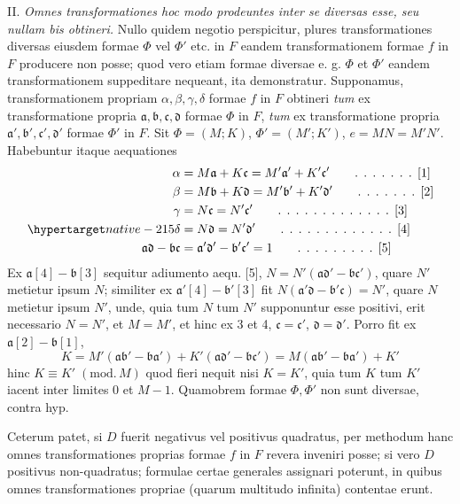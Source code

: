 II. \textit{Omnes transformationes hoc modo prodeuntes inter se diversas esse, seu nullam bis obtineri.} Nullo quidem negotio perspicitur, plures transformationes diversas eiusdem formae $\Phi$ vel $\Phi'$ etc. in $F$ eandem transformationem formae $f$ in $F$ producere non posse; quod vero etiam formae diversae e. g. $\Phi$ et $\Phi'$ eandem transformationem suppeditare nequeant, ita demonstratur. Supponamus, transformationem propriam $\alpha,\beta,\gamma,\delta$ formae $f$ in $F$ obtineri \textit{tum} ex transformatione propria $\mathfrak{a},\mathfrak{b},\mathfrak{c},\mathfrak{d}$ formae $\Phi$ in $F$, \textit{tum} ex transformatione propria $\mathfrak{a}',\mathfrak{b}',\mathfrak{c}',\mathfrak{d}'$ formae $\Phi'$ in $F$. Sit $\Phi=(M;K)$, $\Phi'=(M';K')$, $e=MN=M'N'$. Habebuntur itaque aequationes
\begin{align*}
\alpha&=M\mathfrak{a}+K\mathfrak{c}=M'\mathfrak{a}'+K'\mathfrak{c}' \tag*{. . . . . . . [1]}\\
\beta&=M\mathfrak{b}+K\mathfrak{d}=M'\mathfrak{b}'+K'\mathfrak{d}' \tag*{. . . . . . . [2]}\\
\gamma&=N\mathfrak{c}=N'\mathfrak{c}' \tag*{. . . . . . . . . . . . . [3]}
\\
\SourceLeaf{215}\delta&=N\mathfrak{d}=N'\mathfrak{d}' \tag*{. . . . . . . . . . . . . [4]}\\
\mathfrak{a}\mathfrak{d}-\mathfrak{b}\mathfrak{c}&=\mathfrak{a}'\mathfrak{d}'-\mathfrak{b}'\mathfrak{c}'=1 \tag*{. . . . . . . . . [5]}
\end{align*}
Ex $\mathfrak{a}[4]-\mathfrak{b}[3]$ sequitur adiumento aequ. [5], $N=N'(\mathfrak{a}\mathfrak{d}'-\mathfrak{b}\mathfrak{c}')$, quare $N'$ metietur ipsum $N$; similiter ex $\mathfrak{a}'[4]-\mathfrak{b}'[3]$ fit $N(\mathfrak{a}'\mathfrak{d}-\mathfrak{b}'\mathfrak{c})=N'$, quare $N$ metietur ipsum $N'$, unde, quia tum $N$ tum $N'$ supponuntur esse positivi, erit necessario $N=N'$, et $M=M'$, et hinc ex 3 et 4, $\mathfrak{c}=\mathfrak{c}'$, $\mathfrak{d}=\mathfrak{d}'$. Porro fit ex $\mathfrak{a}[2]-\mathfrak{b}[1]$,
\[
K=M'(\mathfrak{a}\mathfrak{b}'-\mathfrak{b}\mathfrak{a}')+K'(\mathfrak{a}\mathfrak{d}'-\mathfrak{b}\mathfrak{c}')=M(\mathfrak{a}\mathfrak{b}'-\mathfrak{b}\mathfrak{a}')+K'
\]
hinc $K\equiv K'\;(\mathrm{mod.}\,M)$ quod fieri nequit nisi $K=K'$, quia tum $K$ tum $K'$ iacent inter limites 0 et $M-1$. Quamobrem formae $\Phi,\Phi'$ non sunt diversae, contra hyp.

Ceterum patet, si $D$ fuerit negativus vel positivus quadratus, per methodum hanc omnes transformationes proprias formae $f$ in $F$ revera inveniri posse; si vero $D$ positivus non-quadratus; formulae certae generales assignari poterunt, in quibus omnes transformationes propriae (quarum multitudo infinita) contentae erunt.

